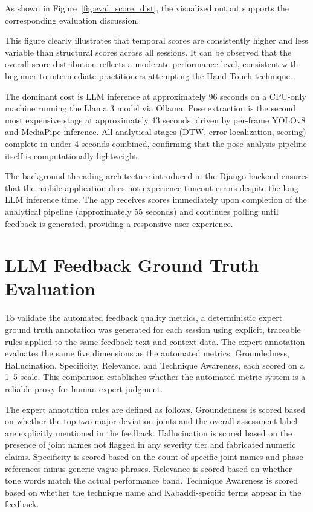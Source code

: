 \begin{sloppypar}
As shown in Figure~\ref{fig:eval_score_dist}, the visualized output supports the corresponding evaluation discussion.

This figure clearly illustrates that temporal scores are consistently higher and less variable than structural scores across all sessions. It can be observed that the overall score distribution reflects a moderate performance level, consistent with beginner-to-intermediate practitioners attempting the Hand Touch technique.

The dominant cost is LLM inference at approximately 96 seconds on a CPU-only machine running the Llama 3 model via Ollama. Pose extraction is the second most expensive stage at approximately 43 seconds, driven by per-frame YOLOv8 and MediaPipe inference. All analytical stages (DTW, error localization, scoring) complete in under 4 seconds combined, confirming that the pose analysis pipeline itself is computationally lightweight.

The background threading architecture introduced in the Django backend ensures that the mobile application does not experience timeout errors despite the long LLM inference time. The app receives scores immediately upon completion of the analytical pipeline (approximately 55 seconds) and continues polling until feedback is generated, providing a responsive user experience.


\section{LLM Feedback Ground Truth Evaluation}

To validate the automated feedback quality metrics, a deterministic expert ground truth annotation was generated for each session using explicit, traceable rules applied to the same feedback text and context data. The expert annotation evaluates the same five dimensions as the automated metrics: Groundedness, Hallucination, Specificity, Relevance, and Technique Awareness, each scored on a 1--5 scale. This comparison establishes whether the automated metric system is a reliable proxy for human expert judgment.

The expert annotation rules are defined as follows. Groundedness is scored based on whether the top-two major deviation joints and the overall assessment label are explicitly mentioned in the feedback. Hallucination is scored based on the presence of joint names not flagged in any severity tier and fabricated numeric claims. Specificity is scored based on the count of specific joint names and phase references minus generic vague phrases. Relevance is scored based on whether tone words match the actual performance band. Technique Awareness is scored based on whether the technique name and Kabaddi-specific terms appear in the feedback.


\end{sloppypar}
